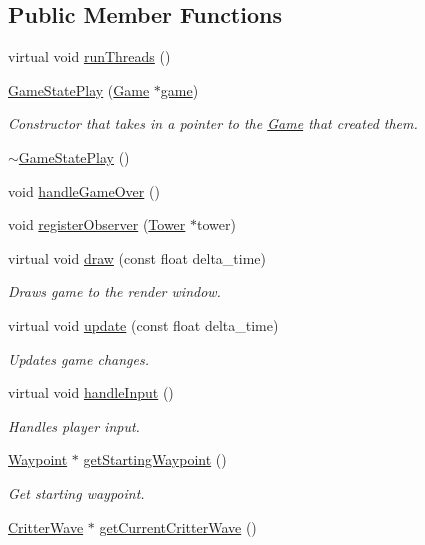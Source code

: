 \subsection*{Public Member Functions}
\begin{DoxyCompactItemize}
\item 
virtual void \hyperlink{class_game_state_play_ab41594c10b04429a3126d4a8085de82d}{run\+Threads} ()
\item 
\hyperlink{class_game_state_play_a705c09eac3d2b27757e5b4cc048b22d5}{Game\+State\+Play} (\hyperlink{class_game}{Game} $\ast$\hyperlink{class_game_state_a355a79415b9ef63c2aec1448a99f6e71}{game})
\begin{DoxyCompactList}\small\item\em Constructor that takes in a pointer to the \hyperlink{class_game}{Game} that created them. \end{DoxyCompactList}\item 
\hyperlink{class_game_state_play_ae4f10dc83f16da01f425d09f9fbb4ef6}{$\sim$\+Game\+State\+Play} ()
\item 
void \hyperlink{class_game_state_play_aec5f72cea0e80d1d83b9cbe155a65ce9}{handle\+Game\+Over} ()
\item 
void \hyperlink{class_game_state_play_a5076f9d4d81b1b9dc4e71c627f40a9d2}{register\+Observer} (\hyperlink{class_tower}{Tower} $\ast$tower)
\item 
virtual void \hyperlink{class_game_state_play_a63a3ba0c891afd8ec126806bab4f315a}{draw} (const float delta\+\_\+time)
\begin{DoxyCompactList}\small\item\em Draws game to the render window. \end{DoxyCompactList}\item 
virtual void \hyperlink{class_game_state_play_a2faf041a447ddf86726658455560abb8}{update} (const float delta\+\_\+time)
\begin{DoxyCompactList}\small\item\em Updates game changes. \end{DoxyCompactList}\item 
virtual void \hyperlink{class_game_state_play_ae9acc781e1fdbc931784ba3892c469ce}{handle\+Input} ()
\begin{DoxyCompactList}\small\item\em Handles player input. \end{DoxyCompactList}\item 
\hyperlink{class_waypoint}{Waypoint} $\ast$ \hyperlink{class_game_state_play_a6ebd21112217871afe2e0160f6eb0753}{get\+Starting\+Waypoint} ()
\begin{DoxyCompactList}\small\item\em Get starting waypoint. \end{DoxyCompactList}\item 
\hyperlink{class_critter_wave}{Critter\+Wave} $\ast$ \hyperlink{class_game_state_play_a36f7d1ee2a500290e224a50f679ba3ff}{get\+Current\+Critter\+Wave} ()
\end{DoxyCompactItemize}
